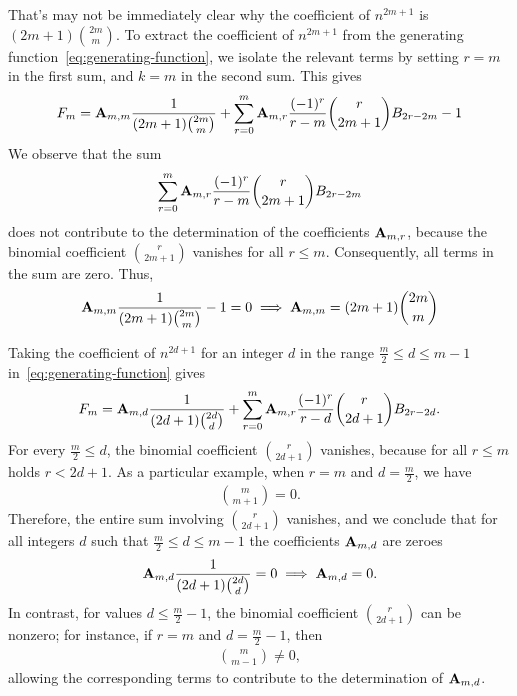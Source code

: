 That's may not be immediately clear why the coefficient of $n^{2m+1}$ is $(2m+1)\binom{2m}{m}$.
To extract the coefficient of $n^{2m+1}$ from the generating function~\eqref{eq:generating-function},
we isolate the relevant terms by setting $r = m$ in the first sum,
and $k = m$ in the second sum.
This gives
\begin{align*}
[n^{2m+1}] F_{m}
    = \coeffA{m}{m} \frac{1}{(2m+1) \binom{2m}{m}}
    + \sum_{r=0}^{m} \coeffA{m}{r} \frac{(-1)^r}{r - m} \binom{r}{2m+1} \bernoulli{2r - 2m}
    - 1
\end{align*}
We observe that the sum
\begin{align*}
    \sum_{r=0}^{m} {\mathbf{A}} \sb{m,r} \frac{(-1)^r}{r - m} \binom{r}{2m+1} {B}\sb{2r - 2m}
\end{align*}
does not contribute to the determination of the coefficients ${\mathbf{A}} \sb{m,r}$, because the binomial coefficient
$\binom{r}{2m+1}$ vanishes for all $r \leq m$.
Consequently, all terms in the sum are zero.
Thus,
\begin{align*}
    {\mathbf{A}} \sb{m,m} \frac{1}{(2m+1) \binom{2m}{m}}  - 1 = 0 \implies {\mathbf{A}} \sb{m,m} = (2m+1) \binom{2m}{m}
\end{align*}

Taking the coefficient of $n^{2d+1}$ for an integer $d$ in the range $\frac{m}{2} \leq d \leq m-1$ in~\eqref{eq:generating-function} gives
\begin{align*}
[n^{2d+1}] F_m = \coeffA{m}{d} \frac{1}{(2d+1) \binom{2d}{d}} + \sum_{r=0}^m \coeffA{m}{r} \frac{(-1)^r}{r-d} \binom{r}{2d+1} \bernoulli{2r-2d}.
\end{align*}
For every $\frac{m}{2} \leq d$, the binomial coefficient $\binom{r}{2d+1}$ vanishes, because for all $r \leq m$
holds $r < 2d+1$.
As a particular example, when $r = m$ and $d = \frac{m}{2}$, we have
\begin{align*}
    \binom{m}{m+1} = 0.
\end{align*}
Therefore, the entire sum involving $\binom{r}{2d+1}$ vanishes, and we conclude
that for all integers $d$ such that $\frac{m}{2} \leq d \leq m-1$ the coefficients ${\mathbf{A}} \sb{m,d}$
are zeroes
\begin{align*}
    {\mathbf{A}} \sb{m,d} \frac{1}{(2d+1) \binom{2d}{d}} = 0 \implies {\mathbf{A}} \sb{m,d} = 0.
\end{align*}
In contrast, for values $d \leq \frac{m}{2} - 1$, the binomial coefficient $\binom{r}{2d+1}$ can be nonzero; for instance, if $r = m$ and $d = \frac{m}{2} - 1$, then
\begin{align*}
    \binom{m}{m - 1} \neq 0,
\end{align*}
allowing the corresponding terms to contribute to the determination of ${\mathbf{A}} \sb{m,d}$.

